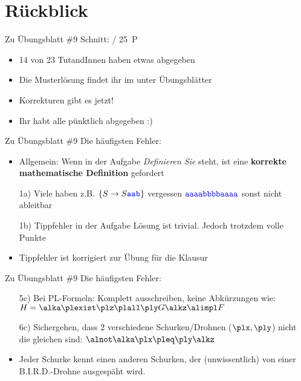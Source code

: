 

\newcommand{\handout}{}



\morescalingdelimiters



\section{Rückblick}

\begin{frame}{Zu Übungsblatt \#9}
	Schnitt:  / 25~P

	\begin{itemize}[<+->]
		\item 14 von 23 TutandInnen haben etwas abgegeben
		\item Die Musterlösung findet ihr im \ILIAS unter Übungsblätter
		\item Korrekturen gibt es jetzt!
		\item Ihr habt alle pünktlich abgegeben :)
	\end{itemize}
\end{frame}

\begin{frame}{Zu Übungsblatt \#9}
	Die häufigsten Fehler:
	\begin{itemize}[<+->]
		\item Allgemein: Wenn in der Aufgabe \textit{Definieren Sie} steht, ist eine \textbf{korrekte mathematische Definition} gefordert
		\item[1a)] Viele haben z.B. $\{ S \to S \hbox{\textcolor{blue}{\texttt{aab}}}\}$ vergessen 
		\implitem $\hbox{\textcolor{blue}{\texttt{aaaabbbbaaaa}}}$ sonst nicht ableitbar
		\item[1b)] Tippfehler in der Aufgabe \impl Lösung ist trivial. Jedoch trotzdem volle Punkte
		\item Tippfehler ist korrigiert zur Übung für die Klausur
	\end{itemize}
\end{frame}

\begin{frame}{Zu Übungsblatt \#9}
	Die häufigsten Fehler:
	\begin{itemize}[<+->]
		\item[5c)] Bei PL-Formeln: Komplett ausschreiben, keine Abkürzungen wie: $H = \bleftBr \plexist \plz \plall \ply G \brightBr \alimpl F$ 
		\item[6c)] Sichergehen, dass 2 verschiedene Schurken/Drohnen ($\plx , \ply$) nicht die gleichen sind: $\alnot \bleftBr \plx \pleq \ply \brightBr$ 
		\item Jeder Schurke kennt einen anderen Schurken, der (unwissentlich) von einer
		B.I.R.D.-Drohne ausgespäht wird.
	\end{itemize}
\end{frame}


